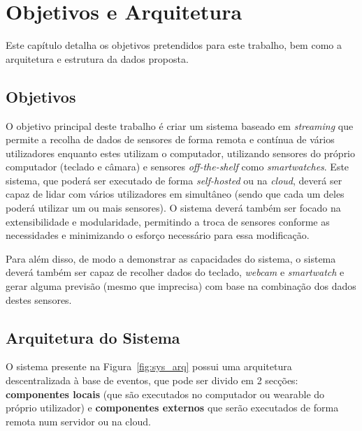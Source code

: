 \chapter{Objetivos e Arquitetura}
\label{chap:objetivos_arquitetura}

\begin{introduction}
Este capítulo detalha os objetivos pretendidos para este trabalho, bem como a arquitetura e estrutura da dados proposta.
\end{introduction}

\section{Objetivos}

O objetivo principal deste trabalho é criar um sistema baseado em \textit{streaming} que permite a recolha de dados de sensores de forma remota e contínua de vários utilizadores enquanto estes utilizam o computador, utilizando sensores do próprio computador (teclado e câmara) e sensores \textit{off-the-shelf} como \textit{smartwatches}. Este sistema, que poderá ser executado de forma \textit{self-hosted} ou na \textit{cloud}, deverá ser capaz de lidar com vários utilizadores em simultâneo (sendo que cada um deles poderá utilizar um ou mais sensores). O sistema deverá também ser focado na extensibilidade e modularidade, permitindo a troca de sensores conforme as necessidades e minimizando o esforço necessário para essa modificação.

Para além disso, de modo a demonstrar as capacidades do sistema, o sistema deverá também ser capaz de recolher dados do teclado, \textit{webcam} e \textit{smartwatch} e gerar alguma previsão (mesmo que imprecisa) com base na combinação dos dados destes sensores.

\section{Arquitetura do Sistema}
\label{sec:arquitecture}

O sistema presente na Figura~\ref{fig:sys_arq} possui uma arquitetura descentralizada à base de eventos, que pode ser divido em 2 secções: \textbf{componentes locais} (que são executados no computador ou wearable do próprio utilizador) e \textbf{componentes externos} que serão executados de forma remota num servidor ou na cloud.

